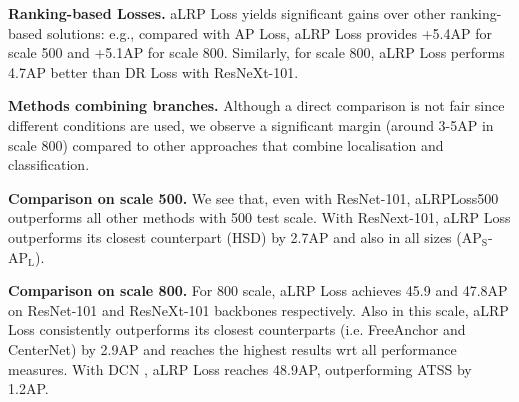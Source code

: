 \documentclass{article}
\begin{document}
\textbf{Ranking-based Losses.} aLRP Loss yields significant gains over other ranking-based solutions: e.g., compared with AP Loss, aLRP Loss provides +5.4AP for scale 500 and +5.1AP for scale 800. Similarly, for scale 800, aLRP Loss performs  4.7AP better than DR Loss with ResNeXt-101.

\textbf{Methods combining branches.} Although a direct comparison is not fair since different conditions are used, we observe a significant margin (around 3-5AP in scale 800) compared to other approaches that combine localisation and classification.

\textbf{Comparison on scale 500.} We see that, even with ResNet-101, aLRPLoss500  outperforms all other methods with 500 test scale. With ResNext-101, aLRP Loss outperforms its closest counterpart (HSD) by 2.7AP and also in all sizes ($\mathrm{AP_S}$-$\mathrm{AP_L}$).

\textbf{Comparison on scale 800.} For 800 scale, aLRP Loss achieves 45.9 and 47.8AP on ResNet-101 and ResNeXt-101 backbones respectively. Also in this scale, aLRP Loss consistently outperforms its closest counterparts (i.e. FreeAnchor and CenterNet) by 2.9AP and reaches the highest results wrt all performance measures. With DCN \cite{DCNv2}, aLRP Loss reaches 48.9AP, outperforming ATSS by 1.2AP.
\end{document}
